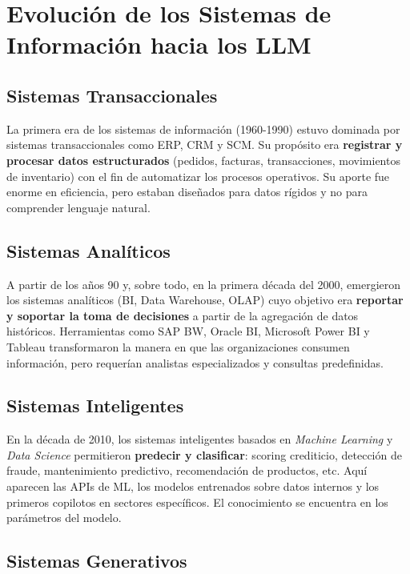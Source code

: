 \documentclass[12pt,a4paper,oneside]{article}
\begin{document}
\section{Evolución de los Sistemas de Información hacia los LLM}

\subsection{Sistemas Transaccionales}

La primera era de los sistemas de información (1960-1990) estuvo dominada por sistemas transaccionales como ERP, CRM y SCM. Su propósito era \textbf{registrar y procesar datos estructurados} (pedidos, facturas, transacciones, movimientos de inventario) con el fin de automatizar los procesos operativos. Su aporte fue enorme en eficiencia, pero estaban diseñados para datos rígidos y no para comprender lenguaje natural.

\subsection{Sistemas Analíticos}

A partir de los años 90 y, sobre todo, en la primera década del 2000, emergieron los sistemas analíticos (BI, Data Warehouse, OLAP) cuyo objetivo era \textbf{reportar y soportar la toma de decisiones} a partir de la agregación de datos históricos. Herramientas como SAP BW, Oracle BI, Microsoft Power BI y Tableau transformaron la manera en que las organizaciones consumen información, pero requerían analistas especializados y consultas predefinidas.

\subsection{Sistemas Inteligentes}

En la década de 2010, los sistemas inteligentes basados en \textit{Machine Learning} y \textit{Data Science} permitieron \textbf{predecir y clasificar}: scoring crediticio, detección de fraude, mantenimiento predictivo, recomendación de productos, etc. Aquí aparecen las APIs de ML, los modelos entrenados sobre datos internos y los primeros copilotos en sectores específicos. El conocimiento se encuentra en los parámetros del modelo.

\subsection{Sistemas Generativos}
\end{document}

